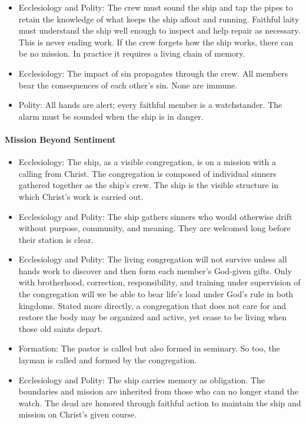 \begin{itemize}
\item Ecclesiology and Polity: The crew must sound the ship and tap the pipes to retain the knowledge of what keeps the ship afloat and running. Faithful laity must understand the ship well enough to inspect and help repair as necessary. This is never ending work. If the crew forgets how the ship works, there can be no mission. In practice it requires a living chain of memory.  

\item Ecclesiology: The impact of sin propagates through the crew. All members bear the consequences of each other's sin. None are immune.

\item Polity: All hands are alert; every faithful member is a watchstander. The alarm must be sounded when the ship is in danger.


\end{itemize}



\paragraph{Mission Beyond Sentiment}
\begin{itemize}

\item Ecclesiology: The ship, as a visible congregation, is on a mission with a calling from Christ. The congregation is composed of individual sinners gathered together as the ship's crew. The ship is the visible structure in which Christ's work is carried out. 

\item Ecclesiology and Polity: The ship gathers sinners who would otherwise drift without purpose, community, and meaning. They are welcomed long before their station is clear. 

\item Ecclesiology and Polity: The living congregation will not survive unless all hands work to discover and then form each member's God-given gifts. Only with brotherhood, correction, responsibility, and training under supervision of the congregation will we be able to bear life's load under God's rule in both kingdoms. Stated more directly, a congregation that does not care for and restore the body may be organized and active, yet cease to be living when those old saints depart. 

\item Formation: The pastor is called but also formed in seminary. So too, the layman is called and formed by the congregation. 

\item Ecclesiology and Polity: The ship carries memory as obligation. The boundaries and mission are inherited from those who can no longer stand the watch. The dead are honored through faithful action to maintain the ship and mission on Christ's given course. 

\end{itemize}




